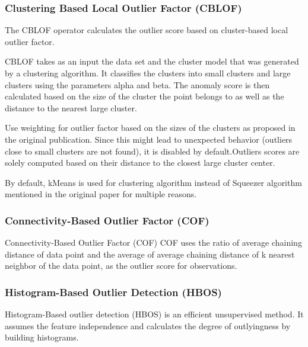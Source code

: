 \subsubsection{Clustering Based Local Outlier Factor (CBLOF)}
\label{subsubsec:introduction:related-works:cblof}
The CBLOF operator calculates the outlier score based on cluster-based local outlier factor.

CBLOF takes as an input the data set and the cluster model that was generated by a clustering algorithm.
It classifies the clusters into small clusters and large clusters using the parameters alpha and beta.
The anomaly score is then calculated based on the size of the cluster the point belongs to as well as the distance to the nearest large cluster.

Use weighting for outlier factor based on the sizes of the clusters as proposed in the original publication.
Since this might lead to unexpected behavior (outliers close to small clusters are not found), it is disabled by default.Outliers scores are solely computed based on their distance to the closest large cluster center.

By default, kMeans is used for clustering algorithm instead of Squeezer algorithm mentioned in the original paper for multiple reasons.
\cite{he2003cblof}

\subsubsection{Connectivity-Based Outlier Factor (COF)}
\label{subsubsec:introduction:related-works:cof}
Connectivity-Based Outlier Factor (COF) COF uses the ratio of average chaining distance of data point and the average of average chaining distance of k nearest neighbor of the data point, as the outlier score for observations.
\cite{tang2002cof}

\subsubsection{Histogram-Based Outlier Detection (HBOS)}
\label{subsubsec:introduction:related-works:hbos}
Histogram-Based outlier detection (HBOS) is an efficient unsupervised method.
It assumes the feature independence and calculates the degree of outlyingness by building histograms.
\cite{goldstein2012hbos}

